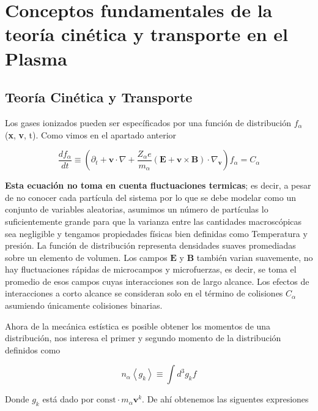 \section{Conceptos fundamentales de la teor\'ia cin\'etica y transporte en el Plasma}



\subsection{Teor\'ia Cin\'etica y Transporte}

Los gases ionizados pueden ser espec\'ificados por una funci\'on de distribuci\'on $f_\alpha$(\textbf{x}, \textbf{v}, t). Como vimos en el apartado anterior

  \begin{equation}\label{eq:k}
    \frac{df_\alpha}{dt} \equiv \left(\partial_t + \textbf{v}\cdot\nabla + \frac{Z_\alpha e}{m_\alpha}(\textbf{E} + \textbf{v}\times\textbf{B})\cdot \nabla_\textbf{v} \right)f_\alpha = C_\alpha
  \end{equation}

  \textbf{Esta ecuaci\'on no toma en cuenta fluctuaciones termicas}; es decir, a pesar de no conocer cada part\'icula del sistema por lo que se debe modelar como un conjunto de variables aleatorias, asumimos un n\'umero de part\'iculas lo suficientemente grande para que la varianza entre las cantidades macrosc\'opicas sea negligible y tengamos propiedades f\'isicas bien definidas como Temperatura y presi\'on. La funci\'on de distribuci\'on representa densidades suaves promediadas sobre un elemento de volumen. Los campos $\textbf{E}$ y $\textbf{B}$ tambi\'en varian suavemente, no hay fluctuaciones r\'apidas de microcampos y microfuerzas, es decir, se toma el promedio de esos campos cuyas interacciones son de largo alcance. Los efectos de interacciones a corto alcance se consideran solo en el t\'ermino de colisiones $C_\alpha$ asumiendo \'unicamente colisiones binarias.

  Ahora de la mec\'anica est\'istica es posible obtener los momentos de una distribuci\'on, nos interesa el primer y segundo momento\cite{helander2005} de la distribuci\'on definidos como 

  \begin{equation}
    n_\alpha\left<g_k\right> \equiv \int d^3 g_k f
  \end{equation}

  Donde $g_k$ est\'a dado por $\text{const} \cdot m_\alpha\textbf{v}^k$. De ah\'i obtenemos las siguentes expresiones 

